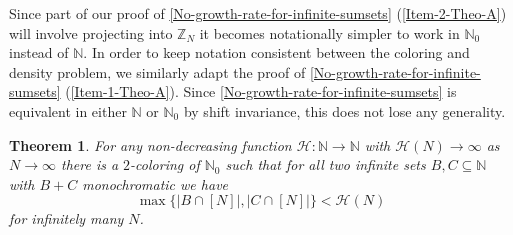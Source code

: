\documentclass[letter, 11pt]{article}
\theoremstyle{plain} %
\newtheorem{theorem}{Theorem}[section]
\theoremstyle{definition} %
\theoremstyle{plain}
\theoremstyle{plain}
\newcommand{\N}{\mathbb{N}}
\newcommand{\Z}{\mathbb{Z}}
\newcommand{\1}{\mathbbm{1}}
\begin{document}
Since part of our proof of \cref{No-growth-rate-for-infinite-sumsets} (\ref{Item-2-Theo-A}) will involve projecting into $\Z_N$ it becomes notationally simpler to work in $\N_0$ instead of $\N$. In order to keep notation consistent between the coloring and density problem, we similarly adapt the proof of \cref{No-growth-rate-for-infinite-sumsets} (\ref{Item-1-Theo-A}). Since \cref{No-growth-rate-for-infinite-sumsets} is equivalent in either $\N$ or $\N_0$ by shift invariance, this does not lose any generality.
\begingroup
\def\thetheorem{\ref{No-growth-rate-for-infinite-sumsets} \ref{Item-1-Theo-A}}
\begin{theorem}\label{Coloring-problem}
    For any non-decreasing function $\mathcal{H}:\N\to \N$ with $\mathcal{H}(N) \to \infty$ as $N\to \infty$ there is a $2$-coloring of $\N_0$ such that for all two infinite sets $B,C\subseteq \N$ with $B+C$ monochromatic we have
    \begin{equation}\label{eq-colorings}
       \max\{|B\cap [N]|, |C\cap [N]|\} < \mathcal{H}(N)  
    \end{equation}
    for infinitely many $N$.
\end{theorem}
\addtocounter{theorem}{-1} %
\endgroup
\end{document}
